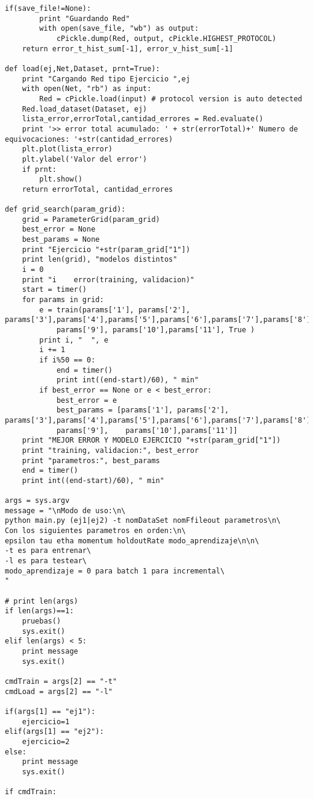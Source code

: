 \begin{lstlisting}[caption=main.py]
	if(save_file!=None):
		print "Guardando Red"
		with open(save_file, "wb") as output:
			cPickle.dump(Red, output, cPickle.HIGHEST_PROTOCOL)
	return error_t_hist_sum[-1], error_v_hist_sum[-1]

def load(ej,Net,Dataset, prnt=True):
	print "Cargando Red tipo Ejercicio ",ej
	with open(Net, "rb") as input:
		Red = cPickle.load(input) # protocol version is auto detected
	Red.load_dataset(Dataset, ej)
	lista_error,errorTotal,cantidad_errores = Red.evaluate()
	print '>> error total acumulado: ' + str(errorTotal)+' Numero de equivocaciones: '+str(cantidad_errores)	
	plt.plot(lista_error)
	plt.ylabel('Valor del error')
	if prnt:
		plt.show()
	return errorTotal, cantidad_errores	

def grid_search(param_grid):
	grid = ParameterGrid(param_grid)
	best_error = None
	best_params = None
	print "Ejercicio "+str(param_grid["1"])
	print len(grid), "modelos distintos"
	i = 0
	print "i 	error(training, validacion)"
	start = timer()
	for params in grid:
	    e = train(params['1'], params['2'], params['3'],params['4'],params['5'],params['6'],params['7'],params['8'],
	    	params['9'], params['10'],params['11'], True )
	    print i, "	", e
	    i += 1
	    if i%50 == 0:
	    	end = timer()
	    	print int((end-start)/60), " min"
	    if best_error == None or e < best_error:
	    	best_error = e
	    	best_params = [params['1'], params['2'], params['3'],params['4'],params['5'],params['6'],params['7'],params['8'],
	    	params['9'], 	params['10'],params['11']]
	print "MEJOR ERROR Y MODELO EJERCICIO "+str(param_grid["1"])
	print "training, validacion:", best_error
	print "parametros:", best_params
	end = timer()
	print int((end-start)/60), " min"
	
args = sys.argv
message = "\nModo de uso:\n\
python main.py (ej1|ej2) -t nomDataSet nomFfileout parametros\n\
Con los siguientes parametros en orden:\n\
epsilon tau etha momentum holdoutRate modo_aprendizaje\n\n\
-t es para entrenar\
-l es para testear\
modo_aprendizaje = 0 para batch 1 para incremental\
"

# print len(args)
if len(args)==1:
	pruebas()
	sys.exit()
elif len(args) < 5:
	print message
	sys.exit()

cmdTrain = args[2] == "-t"
cmdLoad = args[2] == "-l"

if(args[1] == "ej1"):
	ejercicio=1
elif(args[1] == "ej2"):
	ejercicio=2
else:
	print message
	sys.exit()

if cmdTrain:
	

\end{lstlisting}
